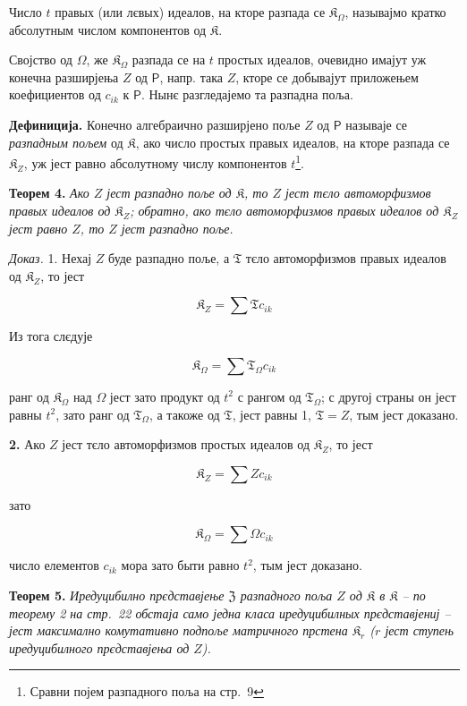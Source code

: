 \documentclass[11pt]{article}
\newcommand{\srcfn}[2]{\footnote{#2}}
\begin{document}
Число \(t\) правых (или лєвых) идеалов, на кторе разпада се \(\mathfrak K_\Omega\), называјмо кратко абсолутным числом компонентов од \(\mathfrak K\).

Својство од \(\Omega\), же \(\mathfrak K_\Omega\) разпада се на \(t\) простых идеалов, очевидно имајут уж конечна разширјења \(Z\) од \(\mathsf P\), напр. така \(Z\), кторе се добывајут приложењем коефициентов од \(c_{ik}\) к \(\mathsf P\). Нынє разгледајемо та разпадна поља.

\textbf{Дефиниција.} Конечно алгебраично разширјено поље \(Z\) од \(\mathsf P\) называје се \emph{разпадным пољем} од \(\mathfrak K\), ако число простых правых идеалов, на кторе разпада се \(\mathfrak K_Z\), уж јест равно абсолутному числу компонентов \(t\)\srcfn{1}{Сравни појем разпадного поља на стр.~9}.

\textbf{Теорем 4.} \emph{Ако \(Z\) јест разпадно поље од \(\mathfrak K\), то \(Z\) јест тєло автоморфизмов правых идеалов од \(\mathfrak K_Z\); обратно, ако тєло автоморфизмов правых идеалов од \(\mathfrak K_Z\) јест равно \(Z\), то \(Z\) јест разпадно поље.}

\emph{Доказ.} 1. Нехај \(Z\) буде разпадно поље, а \(\mathfrak T\) тєло автоморфизмов правых идеалов од \(\mathfrak K_Z\), то јест

\[
\mathfrak K_Z=\sum\mathfrak T c_{ik}
\]

Из тога слєдује

\[
\mathfrak K_\Omega=\sum\mathfrak T_\Omega c_{ik}
\]

ранг од \(\mathfrak K_\Omega\) над \(\Omega\) јест зато продукт од \(t^2\) с рангом од \(\mathfrak T_\Omega\); с другој страны он јест равны \(t^2\), зато ранг од \(\mathfrak T_\Omega\), а такоже од \(\mathfrak T\), јест равны 1, \(\mathfrak T=Z\), тым јест доказано.

\textbf{2.} Ако \(Z\) јест тєло автоморфизмов простых идеалов од \(\mathfrak K_Z\), то јест

\[
\mathfrak K_Z=\sum Zc_{ik}
\]

зато

\[
\mathfrak K_\Omega=\sum\Omega c_{ik}
\]

число елементов \(c_{ik}\) мора зато быти равно \(t^2\), тым јест доказано.

\textbf{Теорем 5.} \emph{Иредуцибилно прєдставјење \(\mathfrak Z\) разпадного поља \(Z\) од \(\mathfrak K\) в \(\mathfrak K\) -- по теорему 2 на стр.~22 обстаја само једна класа иредуцибилных прєдставјениј -- јест максимално комутативно подпоље матричного прстена \(\mathfrak K_r\) (\(r\) јест ступењ иредуцибилного прєдставјења од \(Z\)).}
\end{document}
